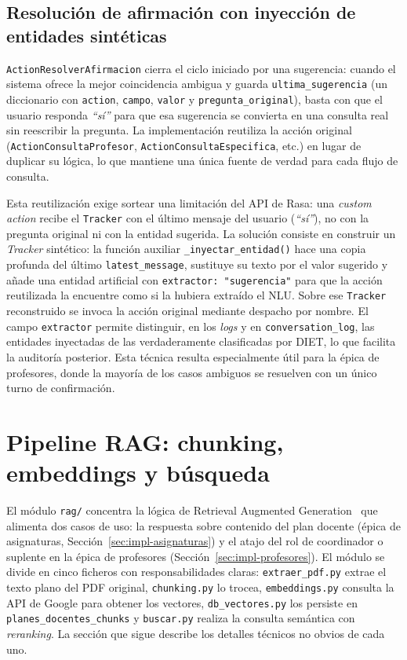 \subsection{Resolución de afirmación con inyección de entidades sintéticas}\label{subsec:impl-resolver-afirmacion}

\texttt{ActionResolverAfirmacion} cierra el ciclo iniciado por una sugerencia: cuando el sistema ofrece la mejor coincidencia ambigua y guarda \texttt{ultima\_sugerencia} (un diccionario con \texttt{action}, \texttt{campo}, \texttt{valor} y \texttt{pregunta\_original}), basta con que el usuario responda \textit{``sí''} para que esa sugerencia se convierta en una consulta real sin reescribir la pregunta. La implementación reutiliza la acción original (\texttt{ActionConsultaProfesor}, \texttt{ActionConsultaEspecifica}, etc.) en lugar de duplicar su lógica, lo que mantiene una única fuente de verdad para cada flujo de consulta.

Esta reutilización exige sortear una limitación del API de Rasa: una \textit{custom action} recibe el \texttt{Tracker} con el último mensaje del usuario (\textit{``sí''}), no con la pregunta original ni con la entidad sugerida. La solución consiste en construir un \textit{Tracker} sintético: la función auxiliar \texttt{\_inyectar\_entidad()} hace una copia profunda del último \texttt{latest\_message}, sustituye su texto por el valor sugerido y añade una entidad artificial con \texttt{extractor: "sugerencia"} para que la acción reutilizada la encuentre como si la hubiera extraído el NLU. Sobre ese \texttt{Tracker} reconstruido se invoca la acción original mediante despacho por nombre. El campo \texttt{extractor} permite distinguir, en los \textit{logs} y en \texttt{conversation\_log}, las entidades inyectadas de las verdaderamente clasificadas por DIET, lo que facilita la auditoría posterior. Esta técnica resulta especialmente útil para la épica de profesores, donde la mayoría de los casos ambiguos se resuelven con un único turno de confirmación.

\section{Pipeline RAG: chunking, embeddings y búsqueda}\label{sec:impl-rag-pipeline}

El módulo \texttt{rag/} concentra la lógica de Retrieval Augmented Generation~\cite{lewis2020retrieval} que alimenta dos casos de uso: la respuesta sobre contenido del plan docente (épica de asignaturas, Sección~\ref{sec:impl-asignaturas}) y el atajo del rol de coordinador o suplente en la épica de profesores (Sección~\ref{sec:impl-profesores}). El módulo se divide en cinco ficheros con responsabilidades claras: \texttt{extraer\_pdf.py} extrae el texto plano del PDF original, \texttt{chunking.py} lo trocea, \texttt{embeddings.py} consulta la API de Google para obtener los vectores, \texttt{db\_vectores.py} los persiste en \texttt{planes\_docentes\_chunks} y \texttt{buscar.py} realiza la consulta semántica con \textit{reranking}. La sección que sigue describe los detalles técnicos no obvios de cada uno.

